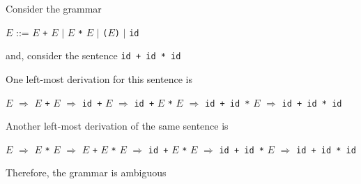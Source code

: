 \documentclass[8pt,a4paper,compress]{beamer}
\newcommand{\mm}[1]{$#1$}
\newenvironment{spaced}
{
\smallskip
\hspace{.5cm}
\begin{minipage}[c]{\textwidth}
}
{
\end{minipage}
\smallskip
}
\begin{document}
\begin{frame}[fragile]
\pause

Consider the grammar

\text{ }
\begin{spaced}
\begin{production}
\mm{E} ::= \mm{E} \lstinline{+} \mm{E} \mm{|} \mm{E} \lstinline{*} \mm{E} \mm{|} \lstinline{(}\mm{E}\lstinline{)} \mm{|} \lstinline{id}
\end{production}
\end{spaced}

\noindent and, consider the sentence \lstinline{id + id * id}

\pause
\bigskip

One left-most derivation for this sentence is

\text{ }
\begin{spaced}
\begin{production}
\underline{\mm{E}} \mm{\Rightarrow} \underline{\mm{E}} \lstinline{+} \mm{E}
   \mm{\Rightarrow} \lstinline{id +} \underline{\mm{E}}
   \mm{\Rightarrow} \lstinline{id +} \underline{\mm{E}} \lstinline{*} \mm{E}
   \mm{\Rightarrow} \lstinline{id + id *} \underline{\mm{E}}
   \mm{\Rightarrow} \lstinline{id + id * id}
\end{production}
\end{spaced}

\pause
\bigskip

Another left-most derivation of the same sentence is

\text{ }
\begin{spaced}
\begin{production}
\underline{\mm{E}} \mm{\Rightarrow} \underline{\mm{E}} \lstinline{*} \mm{E}
   \mm{\Rightarrow} \underline{\mm{E}} \lstinline{+} \mm{E} \lstinline{*} \mm{E}
   \mm{\Rightarrow} \lstinline{id +} \underline{\mm{E}} \lstinline{*} \mm{E}
   \mm{\Rightarrow} \lstinline{id + id *} \underline{\mm{E}}
   \mm{\Rightarrow} \lstinline{id + id * id}
\end{production}
\end{spaced}

\pause
\bigskip

Therefore, the grammar is ambiguous
\end{frame}
\end{document}
